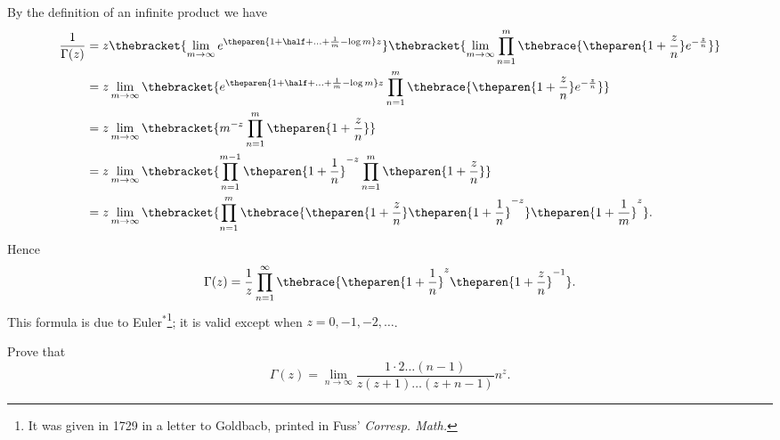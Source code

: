 By the definition of an infinite product we have
\begin{align*}
  \frac{1}{\Gamma(z)} 
  &= z 
    \thebracket{\lim_{m \rightarrow \infty} 
    e^{\theparen{1 + \half + \ldots + \frac{1}{m} - \log m}z}
    \vphantom{\prod_{n=1}^m}} %
    \thebracket{\lim_{m \rightarrow \infty}
    \prod_{n=1}^m
    \thebrace{\theparen{1 + \frac{z}{n}}  e^{-\frac{z}{n}}}} \\
  &=z \lim_{m \rightarrow \infty} \thebracket{
    e^{\theparen{1 + \half + \ldots + \frac{1}{m} - \log m}z}
    \prod_{n=1}^m
    \thebrace{\theparen{1 + \frac{z}{n}}  e^{-\frac{z}{n}}}} \\
  &= z \lim_{m \rightarrow \infty} \thebracket{
    m^{-z} \prod_{n=1}^m \theparen{1 + \frac{z}{n}}} \\
  &= z \lim_{m \rightarrow \infty} \thebracket{
    \prod_{n=1}^{m-1} \theparen{1 + \frac{1}{n}}^{-z}
    \prod_{n=1}^m \theparen{1 + \frac{z}{n}}} \\
  &= z \lim_{m \rightarrow \infty} \thebracket{
    \prod_{n=1}^{m} \thebrace{
    \theparen{1 + \frac{z}{n}}
    \theparen{1 + \frac{1}{n}}^{-z}
    } \theparen{1 + \frac{1}{m}}^z} .
\end{align*}
Hence 
\begin{displaymath}
  \Gamma(z) = \frac{1}{z} \prod_{n=1}^{\infty} \thebrace{
    \theparen{1 + \frac{1}{n}}^{z}
    \theparen{1 + \frac{z}{n}}^{-1} }.
\end{displaymath}
This formula is due to Euler$^*$\footnote{It was given 
in 1729 in a letter to Goldbacb, printed in Fuss'
\emph{Corresp. Math.}}; %
it is valid except when $z = 0, -1, -2, \ldots$. 

\begin{wandwexample*}
  Prove that
  \begin{displaymath}
    \Gamma(z) =
    \lim_{n \rightarrow \infty} 
    \frac{1 \cdot 2 \ldots %
      (n-1)}{z(z+1) \ldots(z+n-1)} n^z . 
  \end{displaymath}
\end{wandwexample*}



